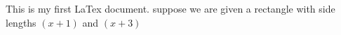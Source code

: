 \documentclass[11pt]{article}
\begin{document}
	This is my first LaTex document.
	suppose we are given a rectangle with side
	lengths $(x+1)$ and $(x+3)$
\end{document}
